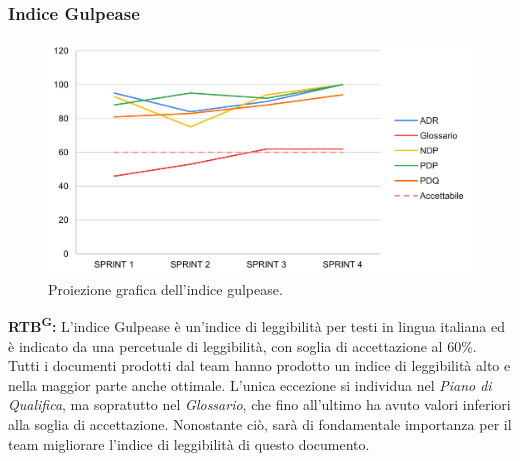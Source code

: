 \documentclass[8pt]{article}
\newcommand{\glossterm}[1]{#1\textsuperscript{G}} %
\begin{document}
\subsubsection{Indice Gulpease}
\begin{figure}[h!]
    \centering
    \includegraphics[width=1\textwidth]{images_pdq/IG.png}
    \caption{Proiezione grafica dell'indice gulpease.}
    \label{fig:Proiezione grafica dell'indice gulpease}
\end{figure}
\textbf{\glossterm{RTB}:} L'indice Gulpease è un'indice di leggibilità per testi in lingua italiana ed è indicato da una percetuale di leggibilità, con soglia di accettazione al 60\%. Tutti i documenti prodotti dal team hanno prodotto un indice di leggibilità alto e nella maggior parte anche ottimale. L'unica eccezione si individua nel \textit{Piano di Qualifica}, ma sopratutto nel \textit{Glossario}, che fino all'ultimo ha avuto valori inferiori alla soglia di accettazione. Nonostante ciò, sarà di fondamentale importanza per il team migliorare l'indice di leggibilità di questo documento.
\clearpage
\end{document}
